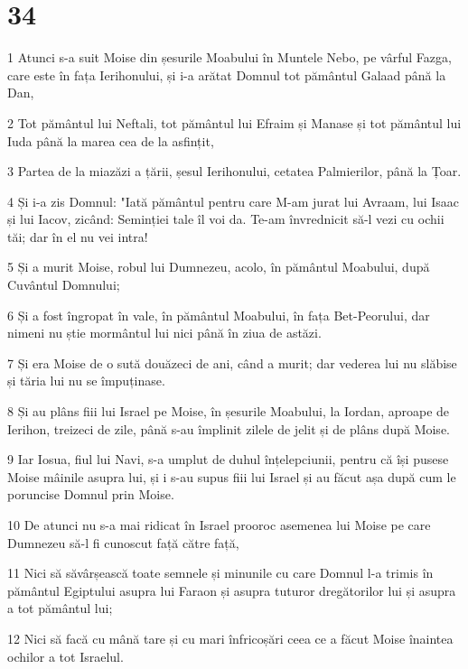 \chapter{34}

\par 1 Atunci s-a suit Moise din șesurile Moabului în Muntele Nebo, pe vârful Fazga, care este în fața Ierihonului, și i-a arătat Domnul tot pământul Galaad până la Dan,
\par 2 Tot pământul lui Neftali, tot pământul lui Efraim și Manase și tot pământul lui Iuda până la marea cea de la asfințit,
\par 3 Partea de la miazăzi a țării, șesul Ierihonului, cetatea Palmierilor, până la Țoar.
\par 4 Și i-a zis Domnul: "Iată pământul pentru care M-am jurat lui Avraam, lui Isaac și lui Iacov, zicând: Seminției tale îl voi da. Te-am învrednicit să-l vezi cu ochii tăi; dar în el nu vei intra!
\par 5 Și a murit Moise, robul lui Dumnezeu, acolo, în pământul Moabului, după Cuvântul Domnului;
\par 6 Și a fost îngropat în vale, în pământul Moabului, în fața Bet-Peorului, dar nimeni nu știe mormântul lui nici până în ziua de astăzi.
\par 7 Și era Moise de o sută douăzeci de ani, când a murit; dar vederea lui nu slăbise și tăria lui nu se împuținase.
\par 8 Și au plâns fiii lui Israel pe Moise, în șesurile Moabului, la Iordan, aproape de Ierihon, treizeci de zile, până s-au împlinit zilele de jelit și de plâns după Moise.
\par 9 Iar Iosua, fiul lui Navi, s-a umplut de duhul înțelepciunii, pentru că își pusese Moise mâinile asupra lui, și i s-au supus fiii lui Israel și au făcut așa după cum le poruncise Domnul prin Moise.
\par 10 De atunci nu s-a mai ridicat în Israel prooroc asemenea lui Moise pe care Dumnezeu să-l fi cunoscut față către față,
\par 11 Nici să săvârșească toate semnele și minunile cu care Domnul l-a trimis în pământul Egiptului asupra lui Faraon și asupra tuturor dregătorilor lui și asupra a tot pământul lui;
\par 12 Nici să facă cu mână tare și cu mari înfricoșări ceea ce a făcut Moise înaintea ochilor a tot Israelul.


